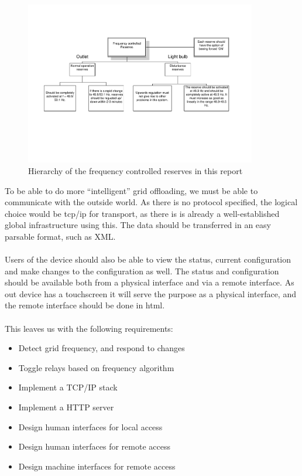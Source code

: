 \begin{figure}[!h]
  \centering
  \includegraphics[width=0.9\textwidth]{figs/Demands_for_automatic_active_reserves.pdf}
  \caption{Hierarchy of the frequency controlled reserves in this report}
  \label{fig:reserver_demands}
\end{figure}
To be able to do more ``intelligent'' grid offloading, we must be able to communicate with the outside world. As there is no protocol specified, the logical choice would be tcp/ip for transport, as there is is already a well-established global infrastructure using this. The data should be transferred in an easy parsable format, such as XML.\\\\
Users of the device should also be able to view the status, current configuration and make changes to the configuration as well. The status and configuration should be available both from a physical interface and via a remote interface. As out device has a touchscreen it will serve the purpose as a physical interface, and the remote interface should be done in html.\\\\
This leaves us with the following requirements:
\begin{itemize}
\item Detect grid frequency, and respond to changes
\item Toggle relays based on frequency algorithm
\item Implement a TCP/IP stack
\item Implement a HTTP server
\item Design human interfaces for local access
\item Design human interfaces for remote access
\item Design machine interfaces for remote access
\end{itemize}

